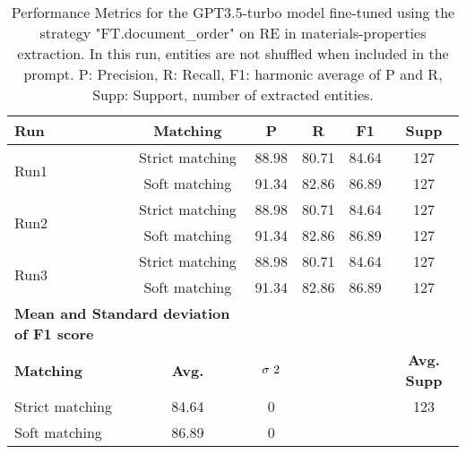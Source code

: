 \begin{table}[htbp]
    \small
    \centering
    \caption{Performance Metrics for the GPT3.5-turbo model fine-tuned using the strategy "FT.document\_order" on RE in materials-properties extraction. In this run, entities are not shuffled when included in the prompt. P: Precision, R: Recall, F1: harmonic average of P and R, Supp: Support, number of extracted entities.}
    \begin{tabular}{lccccc}
        \toprule
        \textbf{Run} & \textbf{Matching} & \textbf{P} & \textbf{R} & \textbf{F1} & \textbf{Supp} \\
        \midrule
        \multirow{2}{*}{Run1}   & Strict matching   & 88.98 & 80.71 & 84.64 & 127 \\
                                & Soft matching     & 91.34 & 82.86 & 86.89 & 127 \\
        \midrule
        \multirow{2}{*}{Run2}   & Strict matching   & 88.98 & 80.71 & 84.64 & 127 \\
                                & Soft matching     & 91.34 & 82.86 & 86.89 & 127 \\
        \midrule
        \multirow{2}{*}{Run3}   & Strict matching   & 88.98 & 80.71 & 84.64 & 127 \\
                                & Soft matching     & 91.34 & 82.86 & 86.89 & 127 \\
        \midrule
        \multicolumn{2}{l}{\textbf{Mean and Standard deviation of F1 score}} & & & & \\
        \midrule
        \textbf{Matching} & \textbf{Avg.} & $\sigma\textsuperscript{2}$ & & & \textbf{Avg. Supp}\\
        Strict matching & 84.64 & 0 &  & &  123 \\
        Soft matching   & 86.89 & 0 & \\
        \bottomrule
    \end{tabular}
\end{table}

